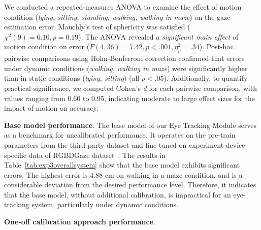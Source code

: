 We conducted a repeated-measures ANOVA to examine the effect of motion condition (\textit{lying, sitting, standing, walking, walking in maze}) on the gaze estimation error. 
Mauchly’s test of sphericity was satisfied ($\chi^2(9) = 6.10, p = 0.19$). 
The ANOVA revealed a \emph{significant main effect} of motion condition on error ($F(4,36) = 7.42, p < .001, \eta_p^2 = .34$). 
Post-hoc pairwise comparisons using Holm-Bonferroni correction confirmed that errors under dynamic conditions 
(\textit{walking, walking in maze}) were significantly higher than in static conditions 
(\textit{lying, sitting}) (all $p<.05$). 
Additionally, to quantify practical significance, we computed Cohen’s \emph{d} for each pairwise comparison, 
with values ranging from 0.60 to 0.95, indicating moderate to large effect sizes for the impact of motion on accuracy.


\begin{table}[!htbp]
\centering
{}
\caption{Comparison of RMSE (mean and std in brackets) for base model and one-off calibration} \label{tab:exp3overallsystem}
\end{table}


\noindent\textbf{Base model performance}. The base model of our Eye Tracking Module serves as a benchmark for uncalibrated performance. It operates on the pre-train parameters from the third-party dataset and fine-tuned on experiment device specific data of RGBDGaze dataset~\cite{arakawa2022rgbdgaze}. The results in Table~\ref{tab:exp3overallsystem} show that the base model exhibits significant errors. The highest error is 4.88 cm on walking in a maze condition, and is a considerable deviation from the desired performance level. Therefore, it indicates that the base model, without additional calibration, is impractical for an eye-tracking system, particularly under dynamic conditions.


\noindent\textbf{One-off calibration approach performance}. 
 
